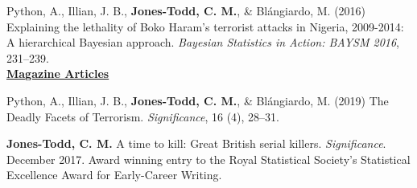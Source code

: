 \documentclass[10pt,a4paper]{moderncv}
\begin{document}
\vspace{-3pt}
Python, A.,  Illian, J. B., \textbf{Jones-Todd, C. M.}, \& Bl\'{a}ngiardo, M. (2016) Explaining the lethality of Boko Haram’s terrorist attacks in Nigeria, 2009-2014: A hierarchical Bayesian approach. \textit{Bayesian Statistics in Action: BAYSM 2016}, 231--239.\\









 
 
\underline{\textbf{Magazine Articles}}\\

\vspace{-3pt}

Python, A.,  Illian, J. B., \textbf{Jones-Todd, C. M.}, \& Bl\'{a}ngiardo, M. (2019) The Deadly Facets of Terrorism. \textit{Significance}, 16 (4), 28--31.\\

\vspace{-3pt}

\textbf{Jones-Todd, C. M.} A time to kill: Great British serial killers. \textit{Significance}. December 2017. Award winning entry to the Royal Statistical Society's Statistical Excellence Award for Early-Career Writing.\\
\end{document}
